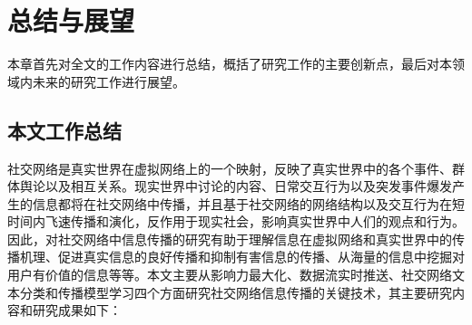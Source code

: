 \chapter{总结与展望}
本章首先对全文的工作内容进行总结，概括了研究工作的主要创新点，最后对本领域内未来的研究工作进行展望。
\section{本文工作总结}
社交网络是真实世界在虚拟网络上的一个映射，反映了真实世界中的各个事件、群体舆论以及相互关系。现实世界中讨论的内容、日常交互行为以及突发事件爆发产生的信息都将在社交网络中传播，并且基于社交网络的网络结构以及交互行为在短时间内飞速传播和演化，反作用于现实社会，影响真实世界中人们的观点和行为。因此，对社交网络中信息传播的研究有助于理解信息在虚拟网络和真实世界中的传播机理、促进真实信息的良好传播和抑制有害信息的传播、从海量的信息中挖掘对用户有价值的信息等等。本文主要从影响力最大化、数据流实时推送、社交网络文本分类和传播模型学习四个方面研究社交网络信息传播的关键技术，其主要研究内容和研究成果如下：
